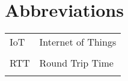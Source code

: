 \section*{Abbreviations}
\label{ch:abbreviations}

{}

\begin{table}[ht!]
    \begin{tabular}{l l}
        IoT & Internet of Things\\\\
        RTT & Round Trip Time \\\\
    \end{tabular}
\end{table}
